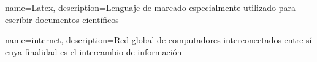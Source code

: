 {
    name=Latex,
    description={Lenguaje de marcado especialmente utilizado para escribir documentos científicos}
}

{
    name=internet,
    description={Red global de computadores interconectados entre sí cuya finalidad es el intercambio de información}
}
